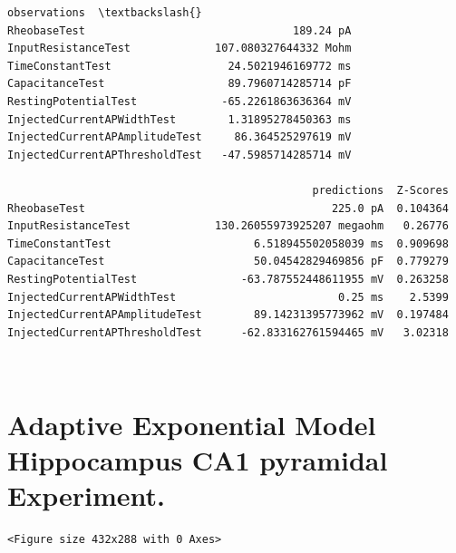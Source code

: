             \begin{tcolorbox}[breakable, size=fbox, boxrule=.5pt, pad at break*=1mm, opacityfill=0]
\begin{Verbatim}[commandchars=\\\{\}]
                                         observations  \textbackslash{}
RheobaseTest                                189.24 pA
InputResistanceTest             107.080327644332 Mohm
TimeConstantTest                  24.5021946169772 ms
CapacitanceTest                   89.7960714285714 pF
RestingPotentialTest             -65.2261863636364 mV
InjectedCurrentAPWidthTest        1.31895278450363 ms
InjectedCurrentAPAmplitudeTest     86.364525297619 mV
InjectedCurrentAPThresholdTest   -47.5985714285714 mV

                                               predictions  Z-Scores
RheobaseTest                                      225.0 pA  0.104364
InputResistanceTest             130.26055973925207 megaohm   0.26776
TimeConstantTest                      6.518945502058039 ms  0.909698
CapacitanceTest                       50.04542829469856 pF  0.779279
RestingPotentialTest                -63.787552448611955 mV  0.263258
InjectedCurrentAPWidthTest                         0.25 ms    2.5399
InjectedCurrentAPAmplitudeTest        89.14231395773962 mV  0.197484
InjectedCurrentAPThresholdTest      -62.833162761594465 mV   3.02318
\end{Verbatim}
\end{tcolorbox}
        
    \begin{center}
    \end{center}
    { \hspace*{\fill} \\}
    
    \hypertarget{adaptive-exponential-model-hippocampus-ca1-pyramidal-experiment.}{%
\section{Adaptive Exponential Model Hippocampus CA1 pyramidal
Experiment.}\label{adaptive-exponential-model-hippocampus-ca1-pyramidal-experiment.}}

    
    \begin{verbatim}
<Figure size 432x288 with 0 Axes>
    \end{verbatim}

